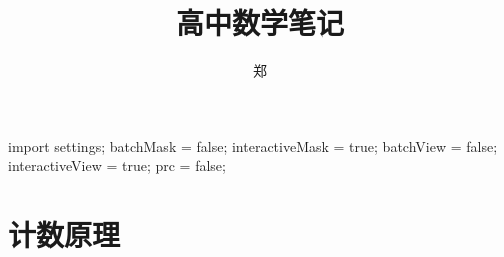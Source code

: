\documentclass[a4paper, openany, UTF8]{ctexbook}
\title{{\Huge 高中数学笔记}}
\author{郑}
\begin{document}
	\begin{asydef}
		import settings;
		batchMask = false;
		interactiveMask = true;
		batchView = false;
		interactiveView = true;
		prc = false;
	\end{asydef}

	\frontmatter
	\setcounter{tocdepth}{1}
	\maketitle

	

	\tableofcontents
	\clearpage
	\mainmatter
	\raggedbottom

	\part{计数原理}
	
	
\end{document}
